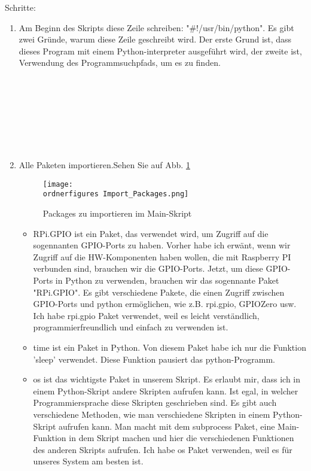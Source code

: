 Schritte: 
\begin{enumerate}
	
	\item Am Beginn des Skripts diese Zeile schreiben: "\#!/usr/bin/python". Es gibt zwei Gründe, warum diese Zeile geschreibt wird. Der erste Grund ist, dass dieses Program mit einem Python-interpreter ausgeführt wird, der zweite ist, Verwendung des Programmsuchpfads, um es zu finden. \\ \\ \\ \\ \\ \\ \\ \\ 
	 \item Alle Paketen importieren.Sehen Sie auf Abb. \ref{fig:Packages zu importieren} 
	 \begin{figure}[H]
	 	\texttt{[image: \\ordnerfigures Import\_Packages.png]}
	 	\caption{Packages zu importieren im Main-Skript}
	 	\label{fig:Packages zu importieren}
	 \end{figure}
	 \begin{itemize}
	 	
	 \item RPi.GPIO ist ein Paket, das verwendet wird, um Zugriff auf die sogennanten GPIO-Ports zu haben. Vorher habe ich erwänt, wenn wir Zugriff auf die HW-Komponenten haben wollen, die mit Raspberry PI verbunden sind, brauchen wir die GPIO-Ports. Jetzt, um diese GPIO-Ports in Python zu verwenden, brauchen wir das sogennante Paket "RPi.GPIO". Es gibt verschiedene Pakete, die einen Zugriff zwischen GPIO-Ports und python ermöglichen, wie z.B. rpi.gpio, GPIOZero usw. Ich habe rpi.gpio Paket verwendet, weil es leicht verständlich, programmierfreundlich und einfach zu verwenden ist. \cite{rpigpio}
	 
	 \item time ist ein Paket in Python. Von diesem Paket habe ich nur die Funktion 'sleep' verwendet. Diese Funktion pausiert das python-Programm. \cite{timepackage}
	 
	 \item os ist das wichtigste Paket in unserem Skript. Es erlaubt mir, dass ich in einem Python-Skript andere Skripten aufrufen kann. Ist egal, in welcher Programmiersprache diese Skripten geschrieben sind. Es gibt auch verschiedene Methoden, wie man verschiedene Skripten in einem Python-Skript aufrufen kann. Man macht mit dem subprocess Paket, eine Main-Funktion in dem Skript machen und hier die verschiedenen Funktionen des anderen Skripts aufrufen. Ich habe os Paket verwenden, weil es für unseres System am besten ist. \cite{ospackage}
	 

\end{itemize}
\end{enumerate}
